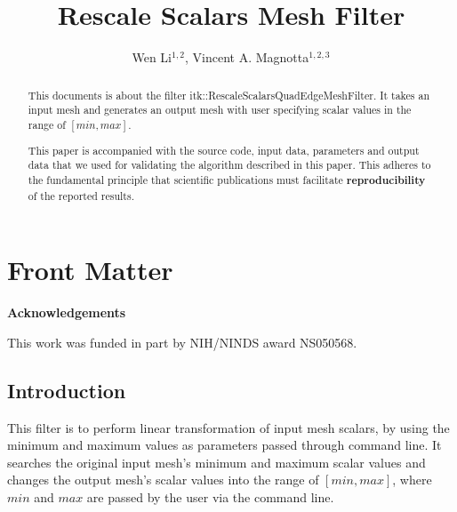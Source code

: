 \documentclass{InsightArticle}
\title{Rescale Scalars Mesh Filter}
\author{Wen Li$^{1,2}$, Vincent A. Magnotta$^{1,2,3}$}
\makeatletter
\newcommand\ackname{Acknowledgements}
\newenvironment{acknowledgements}{%
      \titlepage
      \null\vfil
      \@beginparpenalty\@lowpenalty
      \begin{center}%
        \bfseries \ackname
        \@endparpenalty\@M
      \end{center}}%
     {\par\vfil\null\endtitlepage}
\newenvironment{acknowledgements}{%
      \if@twocolumn
        \section*{\abstractname}%
      \else
        \small
        \begin{center}%
          {\bfseries \ackname\vspace{-.5em}\vspace{\z@}}%
        \end{center}%
        \quotation
      \fi}
      {\if@twocolumn\else\endquotation\fi}
\newcommand{\IJhandlerIDnumber}{3204}
\makeatother
\begin{document}
%
% 
\IJhandlefooter{\IJhandlerIDnumber}


\ifpdf
\else
\fi


\maketitle


\ifhtml
\chapter*{Front Matter\label{front}}
\fi


\begin{abstract}
 
This documents is about the filter itk::RescaleScalarsQuadEdgeMeshFilter.  It
takes an input mesh and generates an output mesh with user specifying scalar
values in the range of $[min, max]$.

This paper is accompanied with the source code, input data, parameters and
output data that we used for validating the algorithm described in this paper.
This adheres to the fundamental principle that scientific publications must
facilitate \textbf{reproducibility} of the reported results.
\end{abstract}

\begin{acknowledgements}
This work was funded in part by NIH/NINDS award NS050568.
\end{acknowledgements}

\tableofcontents

\section{Introduction}
This filter is to perform linear transformation of input mesh scalars, by using the 
minimum and maximum values as parameters passed through command line. 
It searches the original input mesh's minimum and maximum scalar values and 
changes the output mesh's scalar values into the range of $[min, max]$, 
where $min$ and $max$ are passed by the user via the command line.
\end{document}
